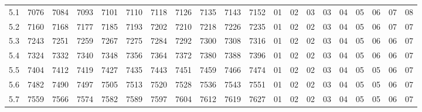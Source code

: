 \documentclass[12pt,UTF8,fontset=none]{ctexbook}
\begin{document}
\begin{appendix}
\begin{longtable}{|c| c c c c c | c c c c c| c c c c c c c c c|}
\scriptsize 5.1 & \scriptsize 7076 & \scriptsize 7084 & \scriptsize 7093 & \scriptsize 7101 & \scriptsize 7110 & \scriptsize 7118 & \scriptsize 7126 & \scriptsize 7135 & \scriptsize 7143 & \scriptsize 7152 & \scriptsize 01 & \scriptsize 02 & \scriptsize 03 & \scriptsize 03 & \scriptsize 04 & \scriptsize 05 & \scriptsize 06 & \scriptsize 07 & \scriptsize 08 \\
\scriptsize 5.2 & \scriptsize 7160 & \scriptsize 7168 & \scriptsize 7177 & \scriptsize 7185 & \scriptsize 7193 & \scriptsize 7202 & \scriptsize 7210 & \scriptsize 7218 & \scriptsize 7226 & \scriptsize 7235 & \scriptsize 01 & \scriptsize 02 & \scriptsize 02 & \scriptsize 03 & \scriptsize 04 & \scriptsize 05 & \scriptsize 06 & \scriptsize 07 & \scriptsize 07 \\
\scriptsize 5.3 & \scriptsize 7243 & \scriptsize 7251 & \scriptsize 7259 & \scriptsize 7267 & \scriptsize 7275 & \scriptsize 7284 & \scriptsize 7292 & \scriptsize 7300 & \scriptsize 7308 & \scriptsize 7316 & \scriptsize 01 & \scriptsize 02 & \scriptsize 02 & \scriptsize 03 & \scriptsize 04 & \scriptsize 05 & \scriptsize 06 & \scriptsize 06 & \scriptsize 07 \\
\scriptsize 5.4 & \scriptsize 7324 & \scriptsize 7332 & \scriptsize 7340 & \scriptsize 7348 & \scriptsize 7356 & \scriptsize 7364 & \scriptsize 7372 & \scriptsize 7380 & \scriptsize 7388 & \scriptsize 7396 & \scriptsize 01 & \scriptsize 02 & \scriptsize 02 & \scriptsize 03 & \scriptsize 04 & \scriptsize 05 & \scriptsize 06 & \scriptsize 06 & \scriptsize 07 \\
\scriptsize 5.5 & \scriptsize 7404 & \scriptsize 7412 & \scriptsize 7419 & \scriptsize 7427 & \scriptsize 7435 & \scriptsize 7443 & \scriptsize 7451 & \scriptsize 7459 & \scriptsize 7466 & \scriptsize 7474 & \scriptsize 01 & \scriptsize 02 & \scriptsize 02 & \scriptsize 03 & \scriptsize 04 & \scriptsize 05 & \scriptsize 05 & \scriptsize 06 & \scriptsize 07 \\
\scriptsize 5.6 & \scriptsize 7482 & \scriptsize 7490 & \scriptsize 7497 & \scriptsize 7505 & \scriptsize 7513 & \scriptsize 7520 & \scriptsize 7528 & \scriptsize 7536 & \scriptsize 7543 & \scriptsize 7551 & \scriptsize 01 & \scriptsize 02 & \scriptsize 02 & \scriptsize 03 & \scriptsize 04 & \scriptsize 05 & \scriptsize 05 & \scriptsize 06 & \scriptsize 07 \\
\scriptsize 5.7 & \scriptsize 7559 & \scriptsize 7566 & \scriptsize 7574 & \scriptsize 7582 & \scriptsize 7589 & \scriptsize 7597 & \scriptsize 7604 & \scriptsize 7612 & \scriptsize 7619 & \scriptsize 7627 & \scriptsize 01 & \scriptsize 02 & \scriptsize 02 & \scriptsize 03 & \scriptsize 04 & \scriptsize 05 & \scriptsize 05 & \scriptsize 06 & \scriptsize 07 \\

\end{longtable}
\end{appendix}
\end{document}
